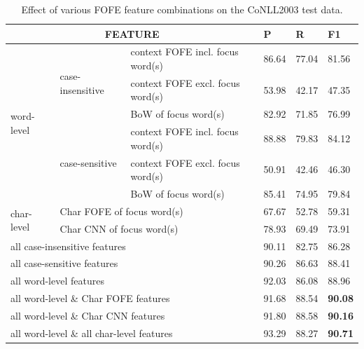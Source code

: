 \documentclass[11pt,a4paper]{article}
\begin{document}
\begin{table}[h!]
	\centering
	\begin{tabular}{|l|l|l|lll|}
		\hline
		\multicolumn{3}{|c|}{FEATURE} & P & R & F1\\
		\hline\hline
		\multirow{6}{*}{word-level} & 
		\multirow{3}{*}{case-insensitive} &
		context FOFE incl. focus word(s) & 86.64 & 77.04 & 81.56 \\
		& &context FOFE excl. focus word(s) & 53.98 & 42.17 & 47.35  \\
		& & BoW of focus word(s) & 82.92 & 71.85 & 76.99  \\ \cline{2-6} 
		& \multirow{3}{*}{case-sensitive} & 
		context FOFE incl. focus word(s) & 88.88 & 79.83 &84.12  \\
		& &context FOFE excl. focus word(s) & 50.91 & 42.46 & 46.30  \\
		& & BoW of focus word(s) & 85.41 & 74.95 & 79.84  \\ \hline
		\multirow{2}{*}{char-level} &
		\multicolumn{2}{l|}{Char FOFE of focus word(s)} & 67.67 & 52.78 & 59.31  \\
		& \multicolumn{2}{l|}{Char CNN of focus word(s)} & 78.93 & 69.49 & 73.91 \\ \hline
		\multicolumn{3}{|l|}{all case-insensitive features} &  90.11 & 82.75 &  86.28  \\ 
		\multicolumn{3}{|l|}{all case-sensitive features} & 90.26 & 86.63 & 88.41 \\ 
		\multicolumn{3}{|l|}{all word-level features} & 92.03 & 86.08 & 88.96  \\ \hline
		\multicolumn{3}{|l|}{all word-level \& Char FOFE features} & 91.68 &  88.54 & \bf 90.08 \\
		\multicolumn{3}{|l|}{all word-level \& Char CNN features} & 91.80 & 88.58 & \bf 90.16 \\ \hline
		\multicolumn{3}{|l|}{all word-level \& all char-level features}  & 93.29 &  88.27 &  \bf 90.71  \\
		\hline
	\end{tabular}
	\caption{Effect of various FOFE feature combinations on the CoNLL2003 test data.}
	\label{tbl:feat-cmp:CoNLL03}
\end{table}
\end{document}
